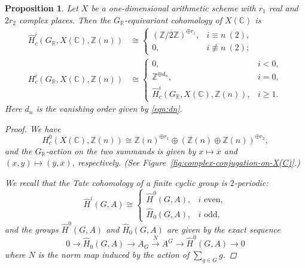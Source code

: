 \documentclass[draft]{article}
\newcommand{\CC}{\mathbb{C}}
\newcommand{\RR}{\mathbb{R}}
\newcommand{\ZZ}{\mathbb{Z}}
\theoremstyle{myplain}
\newtheorem{proposition}[theorem]{Proposition}
\theoremstyle{mydefinition}
\begin{document}
\begin{proposition}
  Let $X$ be a one-dimensional arithmetic scheme with $r_1$ real and $2r_2$
  complex places. Then the $G_\RR$-equivariant cohomology of $X(\CC)$ is
  \begin{align}
    \label{eqn:Tate-GR-cohomology-of-X(C)}
    \widehat{H}^i_c (G_\RR, X(\CC), \ZZ (n)) & \cong
                                              \begin{cases}
                                                (\ZZ/2\ZZ)^{\oplus r_1}, & i \equiv n ~ (2), \\
                                                0, & i \not\equiv n ~ (2);
                                              \end{cases} \\
    \label{eqn:usual-GR-cohomology-of-X(C)}
    H^i_c (G_\RR, X(\CC), \ZZ (n)) & \cong
                                    \begin{cases}
                                      0, & i < 0, \\
                                      \ZZ^{\oplus d_n}, & i = 0, \\
                                      \widehat{H}^i_c (G_\RR, X(\CC), \ZZ (n)), & i \ge 1.
                                    \end{cases}
  \end{align}
  Here $d_n$ is the vanishing order given by \eqref{eqn:dn}.

  \begin{proof}
    We have
    \[ H^0_c (X(\CC), \ZZ(n)) \cong
      \ZZ (n)^{\oplus r_1} \oplus (\ZZ (n) \oplus \ZZ (n))^{\oplus r_2}, \]
    and the $G_\RR$-action on the two summands is given by
    $x \mapsto \overline{x}$ and $(x,y) \mapsto (\overline{y}, \overline{x})$,
    respectively. (See Figure~\eqref{fig:complex-conjugation-on-X(C)}.)

    We recall that the Tate cohomology of a finite cyclic group is $2$-periodic:
    \[ \widehat{H}^i (G,A) \cong
      \begin{cases}
        \widehat{H}^0 (G,A), & i\text{ even}, \\
        \widehat{H}_0 (G,A), & i\text{ odd},
      \end{cases} \]
    and the groups $\widehat{H}^0 (G,A)$ and $\widehat{H}_0 (G,A)$ are given by
    the exact sequence
    \[ 0 \to \widehat{H}_0 (G,A) \to
      A_G \xrightarrow{N} A^G \to
      \widehat{H}^0 (G,A) \to 0 \]
    where $N$ is the norm map induced by the action of $\sum_{g\in G} g$.


\end{proof}
\end{proposition}
\end{document}
